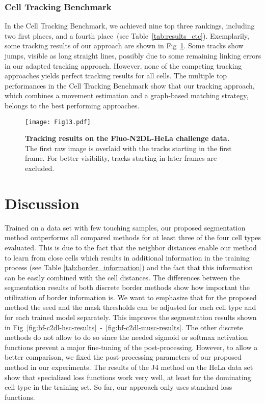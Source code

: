 \documentclass[10pt,letterpaper]{article}
\begin{document}
\subsubsection*{Cell Tracking Benchmark}
In the Cell Tracking Benchmark, we achieved nine top three rankings, including two first places, and a fourth place~(see Table~\ref{tab:results_ctc}). Exemplarily, some tracking results of our approach are shown in Fig~\ref{fig:results-track-hela}. Some tracks show jumps, visible as long straight lines, possibly due to some remaining linking errors in our adapted tracking approach. However, none of the competing tracking approaches yields perfect tracking results for all cells. The multiple top performances in the Cell Tracking Benchmark show that our tracking approach, which combines a movement estimation and a graph-based matching strategy, belongs to the best performing approaches.
\begin{figure}
\centering
\texttt{[image: Fig13.pdf]}
\caption{\textbf{Tracking results on the Fluo-N2DL-HeLa challenge data.} The first raw image is overlaid with the tracks starting in the first frame. For better visibility, tracks starting in later frames are excluded.}
\label{fig:results-track-hela}
\end{figure}

\section*{Discussion}
Trained on a data set with few touching samples, our proposed segmentation method outperforms all compared methods for at least three of the four cell types evaluated. This is due to the fact that the neighbor distances enable our method to learn from close cells which results in additional information in the training process (see Table \ref{tab:border_information}) and the fact that this information can be easily combined with the cell distances. The differences between the segmentation results of both discrete border methods show how important the utilization of border information is. We want to emphasize that for the proposed method the seed and the mask thresholds can be adjusted for each cell type and for each trained model separately. This improves the segmentation results shown in Fig~\ref{fig:bf-c2dl-hsc-results}~-~\ref{fig:bf-c2dl-musc-results}. The other discrete methods do not allow to do so since the needed sigmoid or softmax activation functions prevent a major fine-tuning of the post-processing. However, to allow a better comparison, we fixed the post-processing parameters of our proposed method in our experiments. The results of the J4 method on the HeLa data set show that specialized loss functions work very well, at least for the dominating cell type in the training set. So far, our approach only uses standard loss functions.
\end{document}
